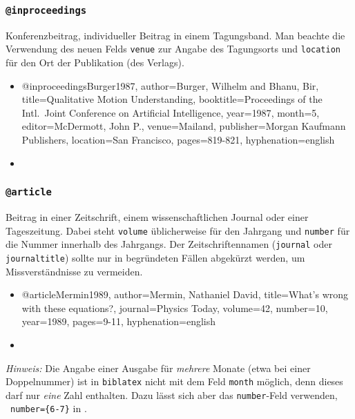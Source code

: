 
\subsubsection{\texttt{@inproceedings}}
\label{sec:@inproceedings}
Konferenzbeitrag, individueller Beitrag in einem Tagungsband.
Man beachte die Verwendung des neuen Felds \texttt{venue}
zur Angabe des Tagungsorts und 
\texttt{location} für den Ort der Publikation (des Verlags).
%
\begin{itemize}
\item[]
\begin{GenericCode}[numbers=none]
@inproceedings{Burger1987,
  author={Burger, Wilhelm and Bhanu, Bir},
  title={Qualitative Motion Understanding},
  booktitle={Proceedings of the Intl.\ Joint Conference on Artificial Intelligence},
  year={1987},
  month={5},
  editor={McDermott, John P.},
  venue={Mailand},
  publisher={Morgan Kaufmann Publishers},
  location={San Francisco},
  pages={819-821},
  hyphenation={english}
}
\end{GenericCode}
\item[\cite{Burger1987}] 
\end{itemize}


\subsubsection{\texttt{@article}}
\label{sec:@article}
Beitrag in einer Zeitschrift, einem wissenschaftlichen Journal oder einer Tageszeitung.
Dabei steht \texttt{volume} üblicherweise für den Jahrgang und \texttt{number} für die 
Nummer innerhalb des Jahrgangs. Der Zeitschriftennamen (\texttt{journal} oder
\texttt{journaltitle}) sollte nur in begründeten Fällen abgekürzt werden, um Missverständnisse
zu vermeiden.
%
\begin{itemize}
\item[]
\begin{GenericCode}[numbers=none]
@article{Mermin1989,
  author={Mermin, Nathaniel David},
  title={What's wrong with these equations?},
  journal={Physics Today},
  volume={42},
  number={10},
  year={1989},
  pages={9-11},
  hyphenation={english}
}
\end{GenericCode}
\item[\cite{Mermin1989}] 
\end{itemize}
%
\emph{Hinweis:} Die Angabe einer Ausgabe für \emph{mehrere} Monate (etwa bei einer Doppelnummer) 
ist in \texttt{biblatex} nicht mit dem Feld \texttt{month} möglich, denn dieses darf nur 
\emph{eine} Zahl enthalten.
Dazu lässt sich aber das \texttt{number}-Feld verwenden, \zB\ \texttt{number=\{6-7\}}
in \cite{Vardavoulia2001}.

